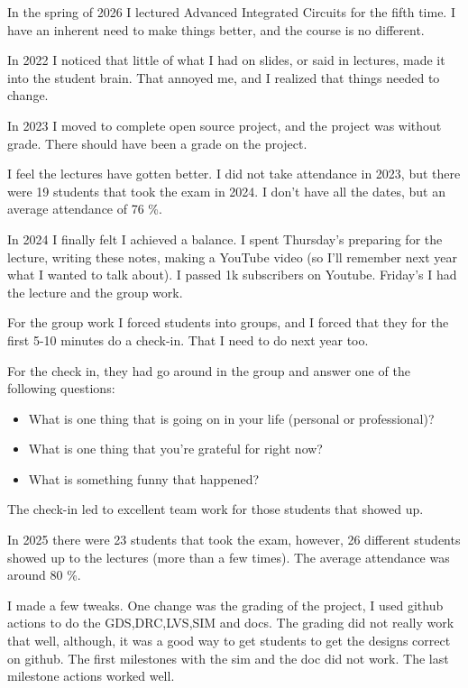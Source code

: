 In the spring of 2026 I lectured Advanced Integrated Circuits for the
fifth time. I have an inherent need to make things better, and the
course is no different.

In 2022 I noticed that little of what I had on slides, or said in
lectures, made it into the student brain. That annoyed me, and I
realized that things needed to change.

In 2023 I moved to complete open source project, and the project was
without grade. There should have been a grade on the project.

I feel the lectures have gotten better. I did not take attendance in
2023, but there were 19 students that took the exam in 2024. I don't
have all the dates, but an average attendance of 76 \%.

In 2024 I finally felt I achieved a balance. I spent Thursday's
preparing for the lecture, writing these notes, making a YouTube video
(so I'll remember next year what I wanted to talk about). I passed 1k
subscribers on Youtube. Friday's I had the lecture and the group work.

For the group work I forced students into groups, and I forced that they
for the first 5-10 minutes do a check-in. That I need to do next year
too.

For the check in, they had go around in the group and answer one of the
following questions:

\begin{itemize}
\tightlist
\item
  What is one thing that is going on in your life (personal or
  professional)?
\item
  What is one thing that you're grateful for right now?
\item
  What is something funny that happened?
\end{itemize}

The check-in led to excellent team work for those students that showed
up.

In 2025 there were 23 students that took the exam, however, 26 different
students showed up to the lectures (more than a few times). The average
attendance was around 80 \%.

I made a few tweaks. One change was the grading of the project, I used
github actions to do the GDS,DRC,LVS,SIM and docs. The grading did not
really work that well, although, it was a good way to get students to
get the designs correct on github. The first milestones with the sim and
the doc did not work. The last milestone actions worked well.


